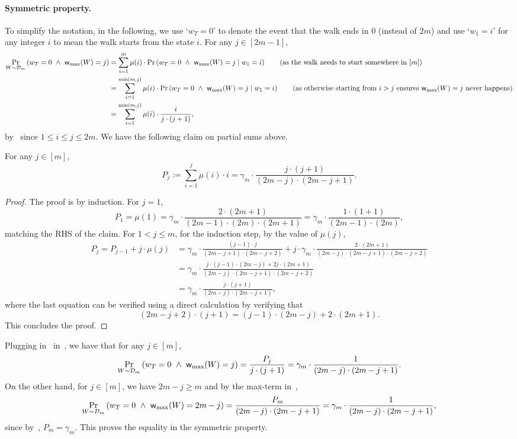 \paragraph{Symmetric property.} To simplify the notation, in the following, we use `$w_T=0$' to denote the event that the walk ends in $0$ (instead of $2m$) and use `$w_1=i$' for any integer $i$ to mean
the walk starts from the state $i$. For any $j \in [2m-1]$, 
\begin{align}
	\Pr_{W \sim \dist_m}\paren{w_T=0 ~\wedge~ \maxwalk{W} = j} &= \sum_{i=1}^{m} \mu(i) \cdot \Pr\paren{w_T=0 ~\wedge~ \maxwalk{W} = j \mid w_1=i} \tag{as the 
	walk needs to start somewhere in $[m]$} \\
	&=  \sum_{i=1}^{\min(m,j)} \mu(i) \cdot \Pr\paren{w_T=0 ~\wedge~ \maxwalk{W} = j \mid w_1=i} \tag{as otherwise starting from $i > j$ ensures $\maxwalk{W}=j$ never happens} \\
	&=  \sum_{i=1}^{\min(m,j)} \mu(i) \cdot \frac{i}{j \cdot (j+1)}, \label{eq:get-back-to}
\end{align}
by~ since $1 \leq i \leq j \leq 2m$. 
We have the following claim on partial sums  above. 
\begin{claim}\label{clm:partial-sum}
	For any $ j \in [m]$, 
	\[
		P_j := \sum_{i=1}^{j} \mu(i) \cdot i = \gamma_m \cdot \frac{j \cdot (j+1)}{(2m-j) \cdot (2m-j+1)}. 
	\]
\end{claim}
\begin{proof}
	The proof is by induction. For $j=1$, 
	\[
		P_1 = \mu(1) = \gamma_{m} \cdot \frac{2 \cdot (2m+1)}{(2m-1)\cdot(2m)\cdot(2m+1)} = \gamma_{m} \cdot \frac{1 \cdot (1+1)}{(2m-1)\cdot(2m)}, 
	\]
	matching the RHS of the claim. For $1  < j \leq m$, for the induction step, by the value of $\mu(j)$, 
	\begin{align*}
		 P_j = P_{j-1} + j \cdot \mu(j) &= \gamma_m \cdot \frac{(j-1) \cdot j}{(2m-j+1) \cdot (2m-j+2)} + j \cdot  \gamma_{m} \cdot \frac{2 \cdot (2m+1)}{(2m-j)\cdot(2m-j+1)\cdot(2m-j+2)} \\
		&= \gamma_m \cdot \frac{{j \cdot (j-1) \cdot (2m-j)+2j \cdot (2m+1)}}{(2m-j)\cdot(2m-j+1)\cdot(2m-j+2)} \tag{by multiplying the first fraction with $(2m-j)/(2m-j)$}\\
		&= \gamma_m \cdot \frac{j \cdot (j+1)}{(2m-j) \cdot (2m-j+1)}, 
	\end{align*}
	where the last equation can be verified using a direct calculation by verifying that 
	\[
		(2m-j+2) \cdot (j+1) = (j-1) \cdot (2m-j)+2\cdot (2m+1). 
	\] 
	This concludes the proof. 
	
\end{proof}
Plugging in~ in~, we have that for any $j \in [m]$, 
\[
	\operatorname*{\textnormal{Pr}}_{W \sim \mathcal{D}_m}\left(w_T=0 ~\wedge~ \textnormal{\textsf{w}}_{\textnormal{max}}(W) = j\right) = \frac{P_j}{j \cdot (j+1)} = \gamma_m \cdot \frac{1}{(2m-j) \cdot (2m-j+1)}.
\]
On the other hand, for $j \in [m]$, we have $2m-j \geq m$ and by the max-term in~, 
\[
	\operatorname*{\textnormal{Pr}}_{W \sim \mathcal{D}_m}\left(w_T=0 ~\wedge~ \textnormal{\textsf{w}}_{\textnormal{max}}(W) = 2m-j\right) = \frac{P_m}{(2m-j) \cdot (2m-j+1)} = \gamma_m \cdot \frac{1}{(2m-j) \cdot (2m-j+1)}, 
\]
since by~, $P_m =\gamma_m$. This proves the equality in the symmetric property. 

